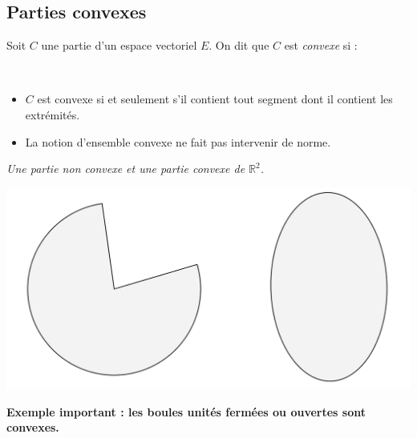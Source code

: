 \documentclass[french,11pt,twoside]{VcCours}
\begin{document}
\subsection{Parties convexes}

\begin{Definition}{} Soit $C$ une partie d'un espace vectoriel $E$. On dit que $C$ est \emph{convexe} si :

\vspace*{1cm}~

\end{Definition}

\begin{Remarques}{}
\begin{itemize} 
\item $C$ est convexe si et seulement s'il contient tout segment dont il contient les extrémités.
\item La notion d'ensemble convexe ne fait pas intervenir de norme.
\end{itemize}
\end{Remarques}{}

\begin{center}
\emph{Une partie non convexe et une partie convexe de $\mathbb{R}^2$.}
\end{center}

\begin{center}
\includegraphics[scale=0.4]{Convexes}
\end{center}

\textbf{Exemple important : les boules unités fermées ou ouvertes sont convexes.}
\end{document}
